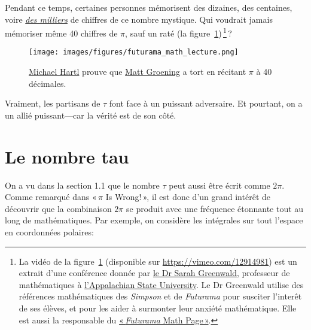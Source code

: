 Pendant ce temps, certaines personnes mémorisent des dizaines, des centaines,
voire
\href{https://www.guinnessworldrecords.com/world-records/most-pi-places-memorised}{\emph{des
milliers}} de chiffres de ce nombre mystique. Qui voudrait jamais mémoriser même
40 chiffres de $\pi$, sauf un raté (la
figure~\ref{fig:futurama_video})\,\footnote{La vidéo de la
figure~\ref{fig:futurama_video} (disponible sur
\url{https://vimeo.com/12914981}) est un extrait d'une conférence donnée par
\href{https://cs.appstate.edu/~sjg/}{le Dr Sarah Greenwald}, professeur de
mathématiques à \href{https://www.appstate.edu/}{l'Appalachian State
University}. Le Dr Greenwald utilise des références mathématiques des
\emph{Simpson} et de \emph{Futurama} pour susciter l'interêt de ses élèves, et
pour les aider à surmonter leur anxiété mathématique. Elle est aussi la
responsable du \href{https://cs.appstate.edu/~sjg/futurama/}{«\,\emph{Futurama}
Math Page\,»}.}\,?

\begin{figure}
\begin{center}
\texttt{[image: images/figures/futurama\_math\_lecture.png]} %
\end{center}
\caption{\href{https://tauday.com/tau-manifesto/\#sec-about_the_author}{Michael
Hartl} prouve que \href{https://fr.wikipedia.org/wiki/Matt_Groening}{Matt
Groening} a tort en récitant $\pi$ à 40 décimales.\label{fig:futurama_video}}
\end{figure}

Vraiment, les partisans de $\tau$ font face à un puissant adversaire. Et
pourtant, on a un allié puissant---car la vérité est de son côté.


\section{Le nombre tau} %
\label{sec:the_number_tau}

On a vu dans la section 1.1 que le nombre $\tau$ peut aussi être écrit comme
$2\pi$. Comme remarqué dans «\,$\pi$ Is Wrong!\,», il est donc d'un grand
intérêt de découvrir que la combinaison $2\pi$ se produit avec une fréquence
étonnante tout au long de mathématiques. Par exemple, on considère les
intégrales sur tout l'espace en coordonnées polaires:

